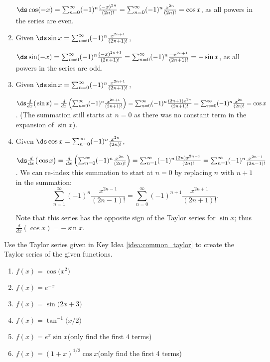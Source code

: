 \begin{enumialphparenastyle}
\begin{ex}
\begin{sol}
\begin{enumerate}
{$\ds\cos (-x) = \sum_{n=0}^\infty (-1)^n\frac{(-x)^{2n}}{(2n)!}=\sum_{n=0}^\infty (-1)^n\frac{x^{2n}}{(2n)!}=\cos x$, as all powers in the series are even.
}
\item 
{Given $\ds \sin x = \sum_{n=0}^\infty (-1)^n\frac{x^{2n+1}}{(2n+1)!}$,

$\ds\sin (-x) = \sum_{n=0}^\infty (-1)^n\frac{(-x)^{2n+1}}{(2n+1)!}=\sum_{n=0}^\infty (-1)^n\frac{-x^{2n+1}}{(2n+1)!}=-\sin x$, as all powers in the series are odd.
}
\item 
{Given $\ds \sin x = \sum_{n=0}^\infty (-1)^n\frac{x^{2n+1}}{(2n+1)!}$,

$\ds\frac{d}{dx}\big(\sin x\big)  = \frac{d}{dx}\left(\sum_{n=0}^\infty (-1)^n\frac{x^{2n+1}}{(2n+1)!}\right)=\sum_{n=0}^\infty (-1)^n\frac{(2n+1)x^{2n}}{(2n+1)!}=\sum_{n=0}^\infty (-1)^n\frac{x^{2n}}{(2n)!}=\cos x$. (The summation still starts at $n=0$ as there was no constant term in the expansion of $\sin x$).
}
\item 
{Given $\ds \cos x = \sum_{n=0}^\infty (-1)^n\frac{x^{2n}}{(2n)!}$,

$\ds\frac{d}{dx}\big(\cos x\big)  = \frac{d}{dx}\left(\sum_{n=0}^\infty (-1)^n\frac{x^{2n}}{(2n)!}\right)=\sum_{n=1}^\infty (-1)^n\frac{(2n)x^{2n-1}}{(2n)!}=\sum_{n=1}^\infty (-1)^n\frac{x^{2n-1}}{(2n-1)!}$. We can re-index this summation to start at $n=0$ by replacing $n$ with $n+1$ in the summation:
$$ \sum_{n=1}^\infty (-1)^n\frac{x^{2n-1}}{(2n-1)!} =\sum_{n=0}^\infty (-1)^{n+1}\frac{x^{2n+1}}{(2n+1)!}.$$

Note that this series has the opposite sign of the Taylor series for $\sin x$; thus $\frac{d}{dx}(\cos x) = -\sin x$.
}
\end{enumerate}
\end{sol}

\end{ex}
\begin{ex}
 Use the Taylor series  given in Key Idea \ref{idea:common_taylor} to create the Taylor series of the given functions.
\begin{enumerate}
\item {$f(x) = \cos \big(x^2\big)$
}
\item {$f(x) = e^{-x}$
}
\item {$f(x) = \sin\big(2x+3\big)$
}
\item {$f(x) = \tan^{-1}\big(x/2\big)$
}
\item {$f(x) = e^x\sin x$\quad (only find the first 4 terms)
}
\item {$f(x) = (1+x)^{1/2}\cos x$\quad (only find the first 4 terms)
} 
\end{enumerate}


\end{ex}
\end{enumialphparenastyle}
